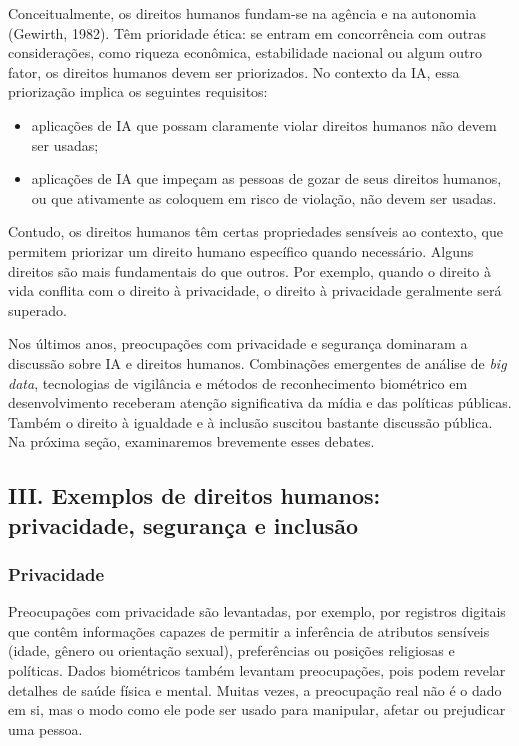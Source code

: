 \documentclass[
  11pt,
]{article}
\providecommand{\tightlist}{%
  \setlength{\itemsep}{0pt}\setlength{\parskip}{0pt}}
\begin{document}
Conceitualmente, os direitos humanos fundam-se na agência e na autonomia
(Gewirth, 1982). Têm prioridade ética: se entram em concorrência com
outras considerações, como riqueza econômica, estabilidade nacional ou
algum outro fator, os direitos humanos devem ser priorizados. No
contexto da IA, essa priorização implica os seguintes requisitos:

\begin{itemize}
\tightlist
\item
  aplicações de IA que possam claramente violar direitos humanos não
  devem ser usadas;
\item
  aplicações de IA que impeçam as pessoas de gozar de seus direitos
  humanos, ou que ativamente as coloquem em risco de violação, não devem
  ser usadas.
\end{itemize}

Contudo, os direitos humanos têm certas propriedades sensíveis ao
contexto, que permitem priorizar um direito humano específico quando
necessário. Alguns direitos são mais fundamentais do que outros. Por
exemplo, quando o direito à vida conflita com o direito à privacidade, o
direito à privacidade geralmente será superado.

Nos últimos anos, preocupações com privacidade e segurança dominaram a
discussão sobre IA e direitos humanos. Combinações emergentes de análise
de \emph{big data}, tecnologias de vigilância e métodos de
reconhecimento biométrico em desenvolvimento receberam atenção
significativa da mídia e das políticas públicas. Também o direito à
igualdade e à inclusão suscitou bastante discussão pública. Na próxima
seção, examinaremos brevemente esses debates.

\subsection{III. Exemplos de direitos humanos: privacidade, segurança e
inclusão}\label{iii.-exemplos-de-direitos-humanos-privacidade-seguranuxe7a-e-inclusuxe3o}

\subsubsection{Privacidade}\label{privacidade}

Preocupações com privacidade são levantadas, por exemplo, por registros
digitais que contêm informações capazes de permitir a inferência de
atributos sensíveis (idade, gênero ou orientação sexual), preferências
ou posições religiosas e políticas. Dados biométricos também levantam
preocupações, pois podem revelar detalhes de saúde física e mental.
Muitas vezes, a preocupação real não é o dado em si, mas o modo como ele
pode ser usado para manipular, afetar ou prejudicar uma pessoa.
\end{document}
